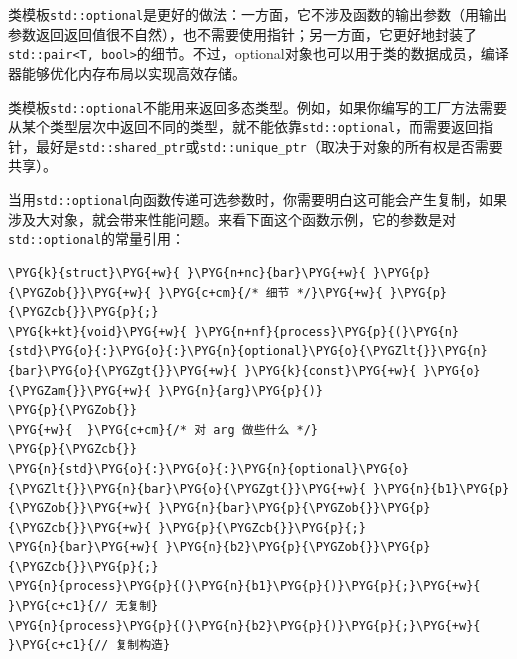 类模板\texttt{std::\allowbreak{}optional}是更好的做法：一方面，它不涉及函数的输出参数（用输出参数返回返回值很不自然），也不需要使用指针；另一方面，它更好地封装了\texttt{std::\allowbreak{}pair<\allowbreak{}T, bool>}的细节。不过，optional对象也可以用于类的数据成员，编译器能够优化内存布局以实现高效存储。



\begin{myNote}
类模板\texttt{std::\allowbreak{}optional}不能用来返回多态类型。例如，如果你编写的工厂方法需要从某个类型层次中返回不同的类型，就不能依靠\texttt{std::\allowbreak{}optional}，而需要返回指针，最好是\texttt{std::\allowbreak{}shared\_\allowbreak{}ptr}或\texttt{std::\allowbreak{}unique\_\allowbreak{}ptr}（取决于对象的所有权是否需要共享）。
\end{myNote}


当用\texttt{std::\allowbreak{}optional}向函数传递可选参数时，你需要明白这可能会产生复制，如果涉及大对象，就会带来性能问题。来看下面这个函数示例，它的参数是对\texttt{std::\allowbreak{}optional}的常量引用：



\begin{codeblockbg}
\begin{Verbatim}[commandchars=\\\{\},breaklines=true,breakanywhere=true,fontsize=\codefont,xleftmargin=17bp]
\PYG{k}{struct}\PYG{+w}{ }\PYG{n+nc}{bar}\PYG{+w}{ }\PYG{p}{\PYGZob{}}\PYG{+w}{ }\PYG{c+cm}{/* 细节 */}\PYG{+w}{ }\PYG{p}{\PYGZcb{}}\PYG{p}{;}
\PYG{k+kt}{void}\PYG{+w}{ }\PYG{n+nf}{process}\PYG{p}{(}\PYG{n}{std}\PYG{o}{:}\PYG{o}{:}\PYG{n}{optional}\PYG{o}{\PYGZlt{}}\PYG{n}{bar}\PYG{o}{\PYGZgt{}}\PYG{+w}{ }\PYG{k}{const}\PYG{+w}{ }\PYG{o}{\PYGZam{}}\PYG{+w}{ }\PYG{n}{arg}\PYG{p}{)}
\PYG{p}{\PYGZob{}}
\PYG{+w}{  }\PYG{c+cm}{/* 对 arg 做些什么 */}
\PYG{p}{\PYGZcb{}}
\PYG{n}{std}\PYG{o}{:}\PYG{o}{:}\PYG{n}{optional}\PYG{o}{\PYGZlt{}}\PYG{n}{bar}\PYG{o}{\PYGZgt{}}\PYG{+w}{ }\PYG{n}{b1}\PYG{p}{\PYGZob{}}\PYG{+w}{ }\PYG{n}{bar}\PYG{p}{\PYGZob{}}\PYG{p}{\PYGZcb{}}\PYG{+w}{ }\PYG{p}{\PYGZcb{}}\PYG{p}{;}
\PYG{n}{bar}\PYG{+w}{ }\PYG{n}{b2}\PYG{p}{\PYGZob{}}\PYG{p}{\PYGZcb{}}\PYG{p}{;}
\PYG{n}{process}\PYG{p}{(}\PYG{n}{b1}\PYG{p}{)}\PYG{p}{;}\PYG{+w}{ }\PYG{c+c1}{// 无复制}
\PYG{n}{process}\PYG{p}{(}\PYG{n}{b2}\PYG{p}{)}\PYG{p}{;}\PYG{+w}{ }\PYG{c+c1}{// 复制构造}
\end{Verbatim}
\end{codeblockbg}


